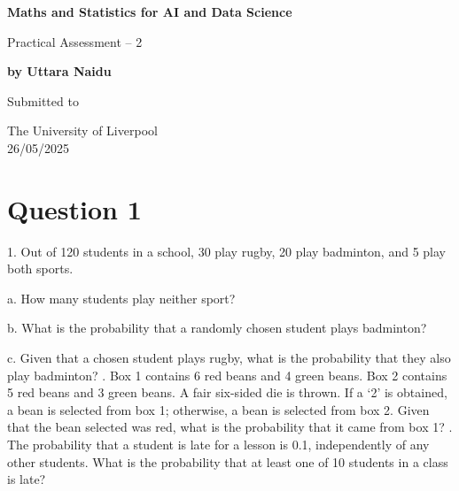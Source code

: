\documentclass[a4paper]{report}
\begin{document}
\pagestyle{fancy} %

\fancyhf{} %
\fancyhead[C]{} %
\fancyhead[R]{} %
\fancyfoot[C]{\thepage} %

\begin{titlepage}
    \begin{center}
        \vspace*{1cm}
            
        \Huge
        \textbf{Maths and Statistics for AI and Data Science}
            
        \vspace{0.5cm}
        \LARGE
        Practical Assessment – 2
            
        \vspace{1.5cm}
            
        \textbf{by Uttara Naidu}
            
        \vfill
            
        Submitted to            

        The University of Liverpool\\

        26/05/2025
            
    \end{center}
\end{titlepage}     



\section*{Question 1}

1. Out of 120 students in a school, 30 play rugby, 20 play badminton, and 5 play both sports.

a. How many students play neither sport? 

b. What is the probability that a randomly chosen student plays badminton? 

c. Given that a chosen student plays rugby, what is the probability that they also play badminton? 
. Box 1 contains 6 red beans and 4 green beans. Box 2 contains 5 red beans and 3 green beans. A fair six-sided die is thrown. If a ‘2’ is obtained, a bean is selected from box 1; otherwise, a bean is selected from box 2. Given that the bean selected was red, what is the probability that it came from box 1? 
. The probability that a student is late for a lesson is 0.1, independently of any other students. What is the probability that at least one of 10 students in a class is late? 
\end{document}
